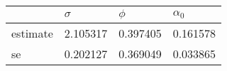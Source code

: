 \begin{tabular}{llll}
\toprule
{} &  $\sigma$ &    $\phi$ & $\alpha_0$ \\
\midrule
estimate &  2.105317 &  0.397405 &   0.161578 \\
se       &  0.202127 &  0.369049 &   0.033865 \\
\bottomrule
\end{tabular}
